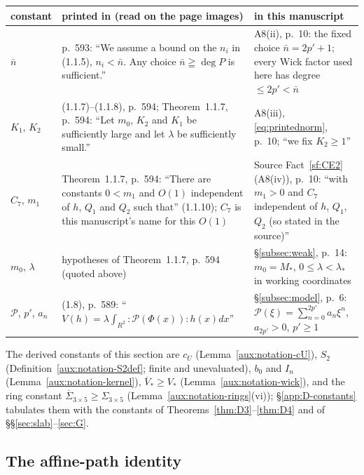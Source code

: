 \documentclass[11pt,a4paper]{article}
\theoremstyle{plain}
\theoremstyle{definition}
\theoremstyle{plain}
\theoremstyle{definition}
\begin{document}
\begin{center}
\small
\begin{tabular}{@{}p{}p{}p{}@{}}
\toprule
constant & printed in \cite{GJS} (read on the page images) & in this manuscript\\
\midrule
$\bar n$ & p.~593: ``We assume a bound on the $n_i$ in (1.1.5), $n_i<\bar n$. Any choice
$\bar n\geqq\deg P$ is sufficient.'' & A8(ii), p.~10: the fixed choice $\bar n=2p'+1$; every
Wick factor used here has degree $\le2p'<\bar n$\\
$K_1$, $K_2$ & (1.1.7)--(1.1.8), p.~594; Theorem~1.1.7, p.~594: ``Let $m_0$, $K_2$ and $K_1$ be
sufficiently large and let $\lambda$ be sufficiently small.'' & A8(iii), \eqref{eq:printednorm}, p.~10;
``we fix $K_2\ge1$''\\
$C_7$, $m_1$ & Theorem~1.1.7, p.~594: ``There are constants $0<m_1$ and $O(1)$ independent of
$h$, $Q_1$ and $Q_2$ such that'' (1.1.10); $C_7$ is this manuscript's name for this $O(1)$ &
Source Fact~\ref{sf:CE2} (A8(iv)), p.~10: ``with $m_1>0$ and $C_7$ independent of $h$, $Q_1$, $Q_2$
(so stated in the source)''\\
$m_0$, $\lambda$ & hypotheses of Theorem~1.1.7, p.~594 (quoted above) & \S\ref{subsec:weak}, p.~14: $m_0=M_*$,
$0\le\lambda<\lambda_*$ in working coordinates\\
$\mathscr P$, $p'$, $a_n$ & (1.8), p.~589: ``$V(h)=\lambda\int_{R^2}:\mathscr P(\Phi(x)):h(x)dx$'' &
\S\ref{subsec:model}, p.~6: $\mathscr P(\xi)=\sum_{n=0}^{2p'}a_n\xi^n$, $a_{2p'}>0$, $p'\ge1$\\
\bottomrule
\end{tabular}
\end{center}

The derived constants of this section are $c_U$ (Lemma~\ref{aux:notation-cU}), $S_2$
(Definition~\ref{aux:notation-S2def}; finite and unevaluated), $b_0$ and $I_n$
(Lemma~\ref{aux:notation-kernel}), $\overline V_*\ge V_*$ (Lemma~\ref{aux:notation-wick}),
and the ring constant $\overline\Sigma_{3\times5}\ge\Sigma_{3\times5}$
(Lemma~\ref{aux:notation-rings}(vi)); \S\ref{app:D-constants}
tabulates them with the constants of Theorems~\ref{thm:D3}--\ref{thm:D4} and of
\S\S\ref{sec:slab}--\ref{sec:G}.

\subsection{The affine-path identity}\label{sec:d1}
\end{document}
